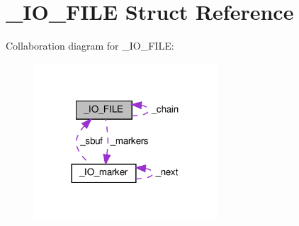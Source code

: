 \hypertarget{struct__IO__FILE}{}\section{\+\_\+\+I\+O\+\_\+\+F\+I\+LE Struct Reference}
\label{struct__IO__FILE}


Collaboration diagram for \+\_\+\+I\+O\+\_\+\+F\+I\+LE\+:\nopagebreak
\begin{figure}[H]
\begin{center}
\leavevmode
\includegraphics[width=194pt]{struct__IO__FILE__coll__graph}
\end{center}
\end{figure}
